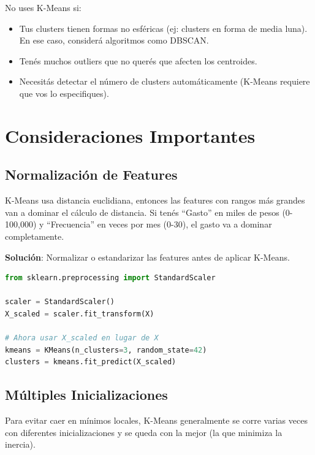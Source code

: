 \documentclass[12pt]{article}
\begin{document}
No uses K-Means si:
\begin{itemize}
    \item Tus clusters tienen formas no esféricas (ej: clusters en forma de media luna). En ese caso, considerá algoritmos como DBSCAN.
    \item Tenés muchos outliers que no querés que afecten los centroides.
    \item Necesitás detectar el número de clusters automáticamente (K-Means requiere que vos lo especifiques).
\end{itemize}

\section{Consideraciones Importantes}

\subsection{Normalización de Features}

K-Means usa distancia euclidiana, entonces las features con rangos más grandes van a dominar el cálculo de distancia. Si tenés ``Gasto'' en miles de pesos (0-100,000) y ``Frecuencia'' en veces por mes (0-30), el gasto va a dominar completamente.

\vspace{0.5em}

\textbf{Solución}: Normalizar o estandarizar las features antes de aplicar K-Means.

\begin{lstlisting}[language=Python]
from sklearn.preprocessing import StandardScaler

scaler = StandardScaler()
X_scaled = scaler.fit_transform(X)

# Ahora usar X_scaled en lugar de X
kmeans = KMeans(n_clusters=3, random_state=42)
clusters = kmeans.fit_predict(X_scaled)
\end{lstlisting}

\subsection{Múltiples Inicializaciones}

Para evitar caer en mínimos locales, K-Means generalmente se corre varias veces con diferentes inicializaciones y se queda con la mejor (la que minimiza la inercia).

\vspace{0.5em}
\end{document}
